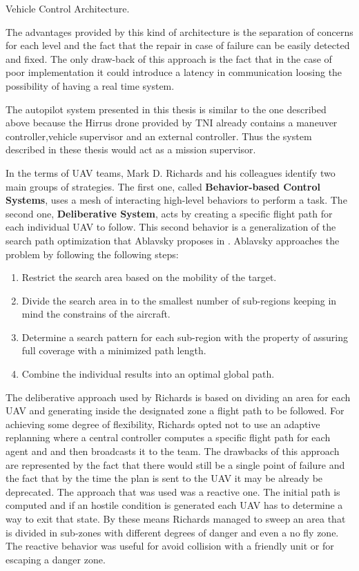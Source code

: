 {Vehicle Control Architecture.}

\newpage
The advantages provided by this kind of architecture is the separation of
concerns for each level and the fact that the repair in case of failure can be
easily detected and fixed. The only draw-back of this approach is the fact
that in the case of poor implementation it could introduce a latency in communication
loosing the possibility of having a real time system.

The autopilot system presented in this thesis is similar to the one described
above because the Hirrus drone \cite{hirrus} provided by TNI already contains
a maneuver controller,vehicle supervisor  and an external controller. Thus the
system described in these thesis would act as a mission supervisor.

In the terms of UAV teams, Mark D. Richards and his colleagues \cite{cooperative}
identify two main groups of strategies. The first one, called \textbf{Behavior-based
Control Systems}, uses a mesh of interacting high-level behaviors to perform a 
task. The second one, \textbf{Deliberative System}, acts by creating a specific
flight path for each individual UAV to follow. This second behavior is a 
generalization of the search path optimization that  Ablavsky proposes in 
  \cite{path-optimization}. Ablavsky approaches the problem by following the 
following steps:

\begin{enumerate}
\item Restrict the search area based on the mobility of the target.
\item Divide the search area in to the smallest number of sub-regions keeping in
mind the constrains of the aircraft.
\item Determine a search pattern for each sub-region with the property of assuring
full coverage with a minimized path length.
\item Combine the individual results into an optimal global path.
\end{enumerate}

The deliberative approach used by Richards is based on dividing an area for 
each UAV and generating inside the designated zone a flight path to be followed.
For achieving some degree of flexibility, Richards opted not to use an adaptive
replanning where a central controller computes a specific flight path for each
agent and and then broadcasts it to the team. The drawbacks of this approach are
represented by the fact that there would still be a single point of failure and
the fact that by the time the plan is sent to the UAV it may be already be 
deprecated. The approach that was used was a reactive one. The initial path
is computed and if an hostile condition is generated each UAV has to determine
a way to exit that state. By these means Richards managed to sweep an area
that is divided in sub-zones with different degrees of danger and even a no fly
zone. The reactive behavior was useful for avoid collision with a friendly unit
or for escaping a danger zone.

